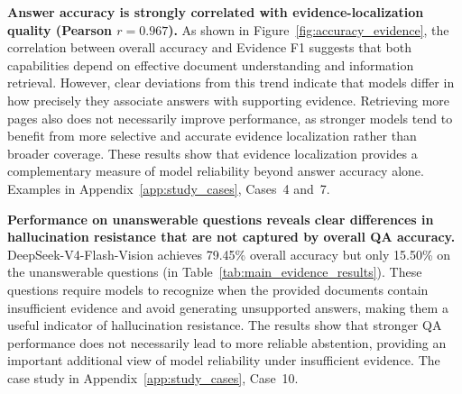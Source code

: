 \documentclass{article} %
\begin{document}
\textbf{Answer accuracy is strongly correlated with evidence-localization quality (Pearson $r=0.967$).}
As shown in Figure~\ref{fig:accuracy_evidence}, the correlation between overall accuracy and Evidence F1 suggests that both capabilities depend on effective document understanding and information retrieval. However, clear deviations from this trend indicate that models differ in how precisely they associate answers with supporting evidence. Retrieving more pages also does not necessarily improve performance, as stronger models tend to benefit from more selective and accurate evidence localization rather than broader coverage. These results show that evidence localization provides a complementary measure of model reliability beyond answer accuracy alone. Examples in Appendix~\ref{app:study_cases}, Cases~4 and~7.


\textbf{Performance on unanswerable questions reveals clear differences in hallucination resistance that are not captured by overall QA accuracy.}
DeepSeek-V4-Flash-Vision achieves 79.45\% overall accuracy but only 15.50\% on the unanswerable questions (in Table~\ref{tab:main_evidence_results}).
These questions require models to recognize when the provided documents contain insufficient evidence and avoid generating unsupported answers, making them a useful indicator of hallucination resistance. The results show that stronger QA performance does not necessarily lead to more reliable abstention, providing an important additional view of model reliability under insufficient evidence. The case study in Appendix~\ref{app:study_cases}, Case~10.
\end{document}
